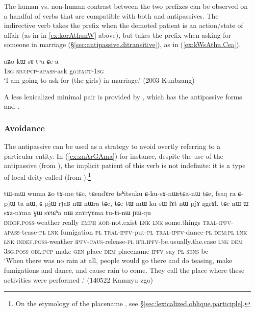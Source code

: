 The human vs. non-human contrast between the two prefixes can be observed on a handful of verbs that are compatible with both  and  antipassives. The indirective verb  takes the  prefix when the demoted patient is an action/state of affair (as in  in \ref{ex:korAthunW} above), but takes the  prefix when asking for someone in marriage (§\ref{sec:antipassive.ditransitive}), as in (\ref{ex:kWsAthu.Cea}).
 
\begin{exe}
\ex \label{ex:kWsAthu.Cea}
\gll  aʑo kɯ-sɤ-tʰu ɕe-a \\
\textsc{1sg} \textsc{sbj}:\textsc{pcp}-\textsc{apass}-ask go:\textsc{fact}-\textsc{1sg} \\
\glt `I am going to ask for (the girls) in marriage.' (2003 Kunbzang)
\end{exe}

A less lexicalized minimal pair is provided by , which has the antipassive forms  and .

\subsubsection{Avoidance} \label{sec:antipassive.avoidance}
The  antipassive can be used as a strategy to avoid overtly referring to a particular entity. In (\ref{ex:znArGAma}) for instance, despite the use of the antipassive  (from ), the implicit patient of this verb is not indefinite: it is a type of local deity called   (from ).\footnote{On the etymology of the placename , see §\ref{sec:lexicalized.oblique.participle}. }

\begin{exe}
\ex \label{ex:znArGAma}
\gll tɯ-mɯ wuma ʑo tɤ-me tɕe, tɕendɤre tsʰitsuku ɕ-ku-sɤ-nɯrtɕa-nɯ tɕe, fsaŋ ra ɕ-pjɯ-ta-nɯ, ɕ-pjɯ-rɟaʁ-nɯ nɯra tɕe, tɕe tɯ-mɯ ku-sɯ-lɤt-nɯ pjɤ-ŋgrɤl. tɕe nɯ ɯ-sɤz-nɤma ɣɯ sɤtɕʰa nɯ znɤrɣɤma tu-ti-nɯ ɲɯ-ŋu \\
\textsc{indef}.\textsc{poss}-weather really \textsc{emph} \textsc{aor}-not.exist \textsc{lnk} \textsc{lnk} some.things \textsc{tral}-\textsc{ipfv}-\textsc{apass}-tease-\textsc{pl} \textsc{lnk} fumigation \textsc{pl} \textsc{tral}-\textsc{ipfv}-put-\textsc{pl} \textsc{tral}-\textsc{ipfv}-dance-\textsc{pl} \textsc{dem}:\textsc{pl} \textsc{lnk} \textsc{lnk} \textsc{indef}.\textsc{poss}-weather \textsc{ipfv}-\textsc{caus}-release-\textsc{pl} \textsc{ifr}.\textsc{ipfv}-be.usually.the.case \textsc{lnk} \textsc{dem} \textsc{3sg}.\textsc{poss}-\textsc{obl}:\textsc{pcp}-make \textsc{gen} place \textsc{dem} placename \textsc{ipfv}-say-\textsc{pl} \textsc{sens}-be \\
\glt `When there was no rain at all, people would go there and do teasing, make fumigations and dance, and cause rain to come. They call the place where these activities were performed .' (140522 Kamnyu zgo) 	
\end{exe}

